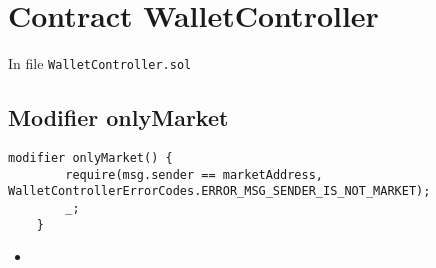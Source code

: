 
\section{Contract WalletController}

In file {\tt WalletController.sol}


\subsection{Modifier onlyMarket}

\begin{lstlisting}[firstnumber=295]
    modifier onlyMarket() {
        require(msg.sender == marketAddress, WalletControllerErrorCodes.ERROR_MSG_SENDER_IS_NOT_MARKET);
        _;
    }
\end{lstlisting}

\noindent\begin{itemize}
  \item {}
\end{itemize}

